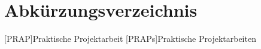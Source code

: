 %
%

\chapter*{Abkürzungsverzeichnis}
\begin{acronym}
%
%
    [PRAP]{Praktische Projektarbeit}
    [PRAPs]{Praktische Projektarbeiten}
%
%
\end{acronym}

